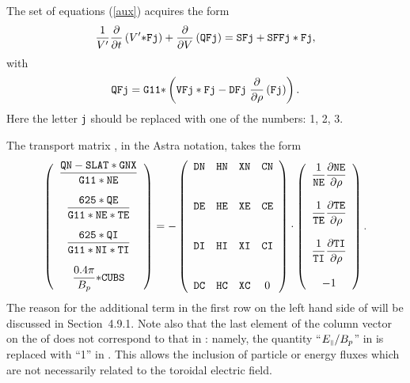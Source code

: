The set of equations (\ref{aux}) acquires the form
\begin{equation}\label{Aux}
\frac{1}{V'}\displaystyle{\partial \over\partial t}\left(V'{\tt *Fj}\right)
+\displaystyle{\partial \over\partial V}\left({\tt QFj}\right)
={\tt SFj+SFFj*Fj}
,\end{equation}
with
\begin{equation}\label{QFj}
{\tt QFj}
={\tt G11*}
\left({\tt VFj*Fj}-{\tt DFj}\;\displaystyle{\partial \over\partial \rho}\left({\tt Fj}\right)\right)
.\end{equation}
Here the letter {\tt j} should be replaced with one of the numbers: 1,
2, 3. 

The transport matrix , in the Astra notation, takes the form
\begin{equation}\label{Afluxes}
\left(
\begin{array}{c}\dstyle
\frac{\tt QN-SLAT*GNX}{\tt G11*NE}
\bigskip\\ \dstyle
\frac{\tt 625*QE}{\tt G11*NE*TE}
\bigskip\\ \dstyle
\frac{\tt 625*QI}{\tt G11*NI*TI}
\bigskip\\ \dstyle
\frac{0.4\pi}{B_p}{\tt *CUBS}
\end{array}
\right)
=
-\left(
\begin{array}{cccc}
\tt DN &\tt HN &\tt XN &\tt CN
\bigskip\bigskip\\ \dstyle
\tt DE &\tt HE &\tt XE &\tt CE
\bigskip\bigskip\\ \dstyle
\tt DI &\tt HI &\tt XI &\tt CI
\bigskip\bigskip\\ \dstyle
\tt DC &\tt HC &\tt XC & 0
\end{array}
\right)
\cdot
\left(
\begin{array}{c}\dstyle
\frac{1}{\tt NE}\prti{\tt NE}{\rho}
\bigskip\\ \dstyle
\frac{1}{\tt TE}\prti{\tt TE}{\rho}
\bigskip\\ \dstyle
\frac{1}{\tt TI}\prti{\tt TI}{\rho}
\bigskip\\ \dstyle
-1
\end{array}
\right)
.\end{equation}
The reason for the additional term  in the first
row on the left hand side of  will be discussed in
Section~4.9.1. 
Note also that the last 
element of the column vector on the \rhs of  does not
correspond to that in :  
namely, the quantity ``$E_{\scriptscriptstyle\parallel}/B_p$'' in  is replaced with
``1'' in . 
This allows the inclusion of particle or energy fluxes which are not
necessarily related to the toroidal electric field. 
